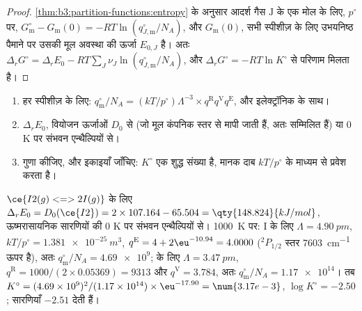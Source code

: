 \begin{proof}
\cref{thm:b3:partition-functions:entropy} के अनुसार आदर्श गैस $\mathrm J$ के एक मोल के लिए, $p^\circ$ पर,
$G^\circ_{\mathrm m} - G_{\mathrm m}(0) = -RT\ln(q^\circ_{J,\mathrm m}/N_A)$, और $G_{\mathrm m}(0)$, सभी स्पीशीज़ के लिए
उभयनिष्ठ पैमाने पर उसकी मूल अवस्था की ऊर्जा $E_{0,J}$ है। अतः $\Delta_rG^\circ =
\Delta_rE_0 - RT\sum_J\nu_J\ln(q^\circ_{J,\mathrm m}/N_A)$, और $\Delta_rG^\circ = -RT\ln K^\circ$ से
परिणाम मिलता है।
\end{proof}

\begin{method}[स्पेक्ट्रमी आँकड़ों से साम्य स्थिरांक परिकलित करना]\label{met:b3:statistical-thermo-applied:k-stat}
\begin{enumerate}
  \item हर स्पीशीज़ के लिए: $q^\circ_{\mathrm m}/N_A = (kT/p^\circ)\Lambda^{-3}\times q^{\mathrm R}q^{\mathrm V}q^{\mathrm E}$,
         और इलेक्ट्रॉनिक  के साथ।
  \item $\Delta_rE_0$, वियोजन ऊर्जाओं $D_0$ से (जो मूल
        कंपनिक स्तर से मापी जाती हैं, अतः  सम्मिलित हैं) या
        0 K पर संभवन एन्थैल्पियों से।
  \item गुणा कीजिए, और इकाइयाँ जाँचिए: $K^\circ$ एक शुद्ध संख्या है, मानक
        दाब $kT/p^\circ$ के माध्यम से प्रवेश करता है।
\end{enumerate}
\end{method}

\begin{example}[आयोडीन का वियोजन]\label{ex:b3:statistical-thermo-applied:iodine}
$\ce{I2(g) <=> 2 I(g)}$ के लिए $\Delta_rE_0 = D_0(\ce{I2}) = 2 \times 107.164 - 65.504 = \qty{148.824}{kJ/mol}$,
ऊष्मरासायनिक सारणियों की 0 K पर संभवन एन्थैल्पियों से।
\qty{1000}{K} पर: I के लिए $\Lambda = \qty{4.90}{pm}$, $kT/p^\circ = \qty{1.381e-25}{m^3}$, $q^{\mathrm E} = 4 +
2\eu^{-10.94} = 4.0000$ (${}^2P_{1/2}$ स्तर \qty{7603}{cm^{-1}} ऊपर है), अतः $q^\circ_{\mathrm m}/N_A = \num{4.69e9}$;
 के लिए $\Lambda = \qty{3.47}{pm}$, $q^{\mathrm R} = 1000/(2 \times 0.05369) = 9313$ और $q^{\mathrm V} = 3.784$, अतः
$q^\circ_{\mathrm m}/N_A = \num{1.17e14}$। तब $K^\circ = (4.69\times10^9)^2/(1.17\times10^{14}) \times \eu^{-17.90} =
\num{3.17e-3}$, $\log K^\circ = -2.50$; सारणियाँ $-2.51$ देती हैं।
\end{example}

